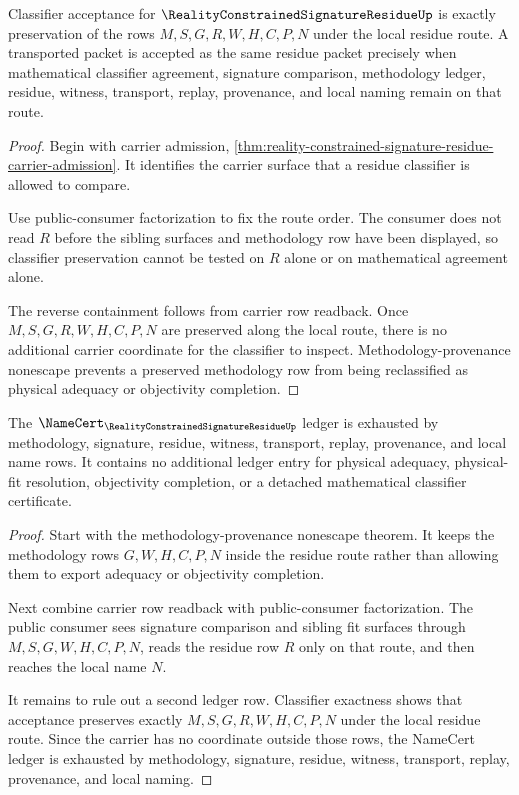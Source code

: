 \begin{theorem}
\label{thm:reality-constrained-signature-residue-classifier-exactness}
Classifier acceptance for $\RealityConstrainedSignatureResidueUp$ is exactly preservation of the rows $M,S,G,R,W,H,C,P,N$ under the local residue route. A transported packet is accepted as the same residue packet precisely when mathematical classifier agreement, signature comparison, methodology ledger, residue, witness, transport, replay, provenance, and local naming remain on that route.
\end{theorem}
\begin{proof}
Begin with carrier admission, \autoref{thm:reality-constrained-signature-residue-carrier-admission}. It identifies the carrier surface that a residue classifier is allowed to compare.

Use public-consumer factorization to fix the route order. The consumer does not read $R$ before the sibling surfaces and methodology row have been displayed, so classifier preservation cannot be tested on $R$ alone or on mathematical agreement alone.

The reverse containment follows from carrier row readback. Once $M,S,G,R,W,H,C,P,N$ are preserved along the local route, there is no additional carrier coordinate for the classifier to inspect. Methodology-provenance nonescape prevents a preserved methodology row from being reclassified as physical adequacy or objectivity completion.
\end{proof}

\begin{theorem}
\label{thm:reality-constrained-signature-residue-namecert-ledger}
The $\NameCert_{\RealityConstrainedSignatureResidueUp}$ ledger is exhausted by methodology, signature, residue, witness, transport, replay, provenance, and local name rows. It contains no additional ledger entry for physical adequacy, physical-fit resolution, objectivity completion, or a detached mathematical classifier certificate.
\end{theorem}
\begin{proof}
Start with the methodology-provenance nonescape theorem. It keeps the methodology rows $G,W,H,C,P,N$ inside the residue route rather than allowing them to export adequacy or objectivity completion.

Next combine carrier row readback with public-consumer factorization. The public consumer sees signature comparison and sibling fit surfaces through $M,S,G,W,H,C,P,N$, reads the residue row $R$ only on that route, and then reaches the local name $N$.

It remains to rule out a second ledger row. Classifier exactness shows that acceptance preserves exactly $M,S,G,R,W,H,C,P,N$ under the local residue route. Since the carrier has no coordinate outside those rows, the NameCert ledger is exhausted by methodology, signature, residue, witness, transport, replay, provenance, and local naming.
\end{proof}

